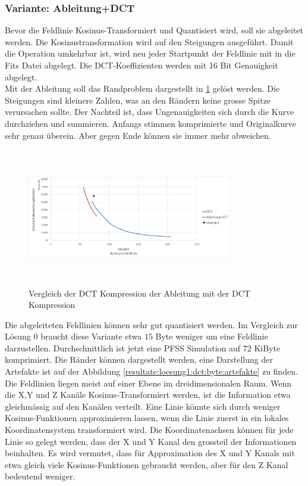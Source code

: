 \subsubsection{Variante: Ableitung+DCT}\label{resultate:dct:ableitung_dct}
Bevor die Feldlinie Kosinus-Transformiert und Quantisiert wird, soll sie abgeleitet werden. Die Kosinustransformation wird auf den Steigungen ausgeführt. Damit die Operation umkehrbar ist, wird neu jeder Startpunkt der Feldlinie mit in die Fits Datei abgelegt. Die DCT-Koeffizienten werden mit 16 Bit Genauigkeit abgelegt.\\
Mit der Ableitung soll das Randproblem dargestellt in \ref{resultate:loesung1:dct:artefakte} gelöst werden. Die Steigungen sind kleinere Zahlen, was an den Rändern keine grosse Spitze verursachen sollte. Der Nachteil ist, dass Ungenauigkeiten sich durch die Kurve durchziehen und summieren. Anfangs stimmen komprimierte und Originalkurve sehr genau überein. Aber gegen Ende können sie immer mehr abweichen.\\
\begin{figure}[!htbp]
	\center
	\includegraphics[width=0.8\textwidth,height=6cm,keepaspectratio]{./pictures/resultate/loesung1/loesung1-1/loesung1_1.png}
	\caption{Vergleich der DCT Kompression der Ableitung mit der DCT Kompression}
	\label{resultate:loesung1:dct:artefakte}
\end{figure}
Die abgeleiteten Feldlinien können sehr gut quantisiert werden. Im Vergleich zur Lösung 0 braucht diese Variante etwa $15$ Byte weniger um eine Feldlinie darzustellen. Durchschnittlich ist jetzt eine PFSS Simulation auf $72$ KiByte komprimiert. Die Ränder können dargestellt werden, eine Darstellung der Artefakte ist auf der Abbildung \ref{resultate:loesung1:dct:byte:artefakte} zu finden.\\
Die Feldlinien liegen meist auf einer Ebene im dreidimensionalen Raum. Wenn die X,Y und Z Kanäle Kosinus-Transformiert werden, ist die Information etwa gleichmässig auf den Kanälen verteilt. Eine Linie könnte sich durch weniger Kosinus-Funktionen approximieren lassen, wenn die Linie zuerst in ein lokales Koordinatensystem transformiert wird. Die Koordinatenachsen können für jede Linie so gelegt werden, dass der X und Y Kanal den grossteil der Informationen beinhalten. Es wird vermutet, dass für Approximation des X und Y Kanals mit etwa gleich viele Kosinus-Funktionen gebraucht werden, aber für den Z Kanal bedeutend weniger.

